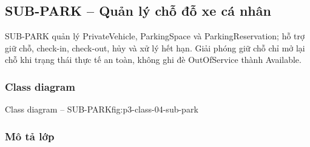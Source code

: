\par\medskip
\noindent\begin{minipage}{\linewidth}
\subsection{SUB-PARK -- Quản lý chỗ đỗ xe cá nhân}
SUB-PARK quản lý PrivateVehicle, ParkingSpace và ParkingReservation; hỗ trợ giữ chỗ, check-in, check-out, hủy và xử lý hết hạn. Giải phóng giữ chỗ chỉ mở lại chỗ khi trạng thái thực tế an toàn, không ghi đè OutOfService thành Available.

\subsubsection{Class diagram}
{Class diagram -- SUB-PARK}{fig:p3-class-04-sub-park}
\end{minipage}\par


\subsubsection{Mô tả lớp}

